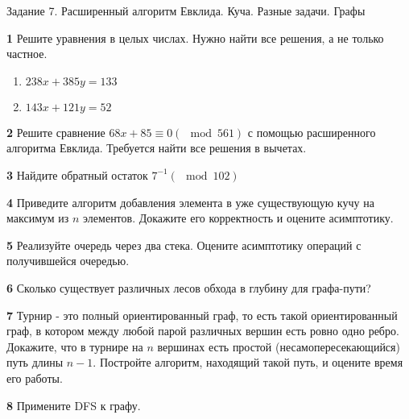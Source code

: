 \documentclass{article}
\begin{document}
\begin{center}
\Large {Задание 7. Расширенный алгоритм Евклида. Куча. Разные задачи. Графы}
\end{center}

\bigskip

\textbf{1} Решите уравнения в целых числах. Нужно найти все решения, а не только частное.

\begin{enumerate}
    \item $238x + 385y = 133$
    \item $143x + 121y = 52$
\end{enumerate}

\medskip

\textbf{2} Решите сравнение $68x + 85 \equiv 0 (\mod 561)$ с помощью расширенного алгоритма Евклида. Требуется найти все решения в вычетах.

\medskip

\textbf{3} Найдите обратный остаток $7^{-1} (\mod 102)$

\medskip

\textbf{4} Приведите алгоритм добавления элемента в уже существующую кучу на максимум из $n$ элементов. Докажите его корректность и оцените асимптотику.

\medskip

\textbf{5} Реализуйте очередь через два стека. Оцените асимптотику операций с получившейся очередью.

\medskip

\textbf{6} Сколько существует различных лесов обхода в глубину для графа-пути?

\medskip

\textbf{7} Турнир - это полный ориентированный граф, то есть такой ориентированный граф, в котором между любой парой различных вершин есть ровно одно ребро. Докажите, что в турнире на $n$ вершинах есть простой (несамопересекающийся) путь длины $n - 1$. Постройте алгоритм, находящий такой путь, и оцените время его работы.

\medskip

\textbf{8} Примените DFS к графу.
\end{document}
